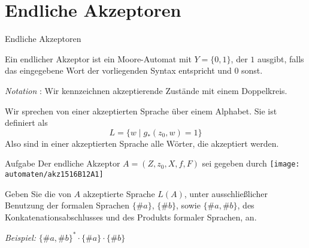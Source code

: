 \section{Endliche Akzeptoren}
\begin{frame}{Endliche Akzeptoren}
	\begin{Definition}
		Ein endlicher Akzeptor ist ein Moore-Automat mit $ Y= \{0,1\}$, der $1$ ausgibt, falls das eingegebene Wort der vorliegenden Syntax entspricht und $0$ sonst.
	\end{Definition} 

	\emph{Notation} : Wir kennzeichnen akzeptierende Zustände mit einem Doppelkreis. \\ \pause
	
	Wir sprechen von einer akzeptierten Sprache über einem Alphabet. Sie ist definiert als $$ L = \{ w \mid g_*(z_0,w) = 1 \} $$ 
	Also sind in einer akzeptierten Sprache alle Wörter, die akzeptiert werden.
\end{frame}

\begin{frame}{}
\end{frame}



\begin{frame}{Aufgabe}
	Der endliche Akzeptor $A = (Z, z_0, X, f, F)$ sei gegeben durch
	\texttt{[image: automaten/akz1516B12A1]}
	
	Geben Sie die von $A$ akzeptierte Sprache $L(A)$, unter ausschließlicher Benutzung der formalen Sprachen $\{\#a\}$, $\{\#b\}$, sowie $\{\#a, \#b\}$, des Konkatenationsabschlusses und des Produkts formaler Sprachen, an.
	
	\emph{Beispiel:} $\{\#a, \#b\}^* \cdot \{\#a\} \cdot \{\#b\}$
	
\end{frame}

